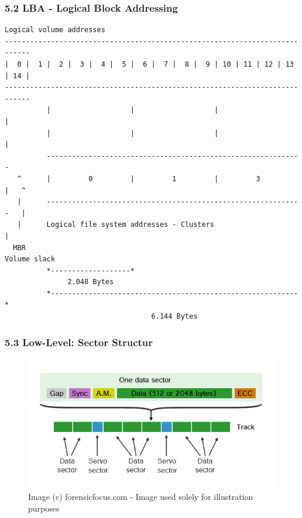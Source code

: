 \begin{frame}[fragile]
  \frametitle{5.2 LBA - Logical Block Addressing}
  \begin{lstlisting}[basicstyle=\tiny\ttfamily]
Logical volume addresses
----------------------------------------------------------------------------
|  0 |  1 |  2 |  3 |  4 |  5 |  6 |  7 |  8 |  9 | 10 | 11 | 12 | 13 | 14 |
----------------------------------------------------------------------------
          |                   |                   |                   |
          |                   |                   |                   |
          -------------------------------------------------------------
   ^      |         0         |         1         |         3         |   ^
   |      -------------------------------------------------------------   |
   |      Logical file system addresses - Clusters                        |
  MBR                                                               Volume slack
          *-------------------*
               2.048 Bytes
          *-----------------------------------------------------------*
                                   6.144 Bytes
  \end{lstlisting}
\end{frame}


\begin{frame}[fragile]
  \frametitle{5.3 Low-Level: Sector Structur}
    \begin{figure}
        \includegraphics[scale=0.5]{images/sector.png}
        \captionsetup{labelformat=empty,labelsep=none}
        \caption[]{\tiny Image (c) forensicfocus.com - Image used solely for illustration purposes}
    \end{figure}
\end{frame}


